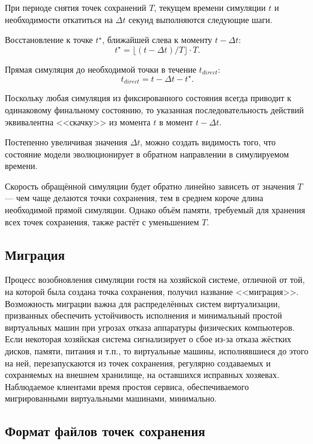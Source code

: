 При периоде снятия точек сохранений $T$, текущем времени симуляции $t$  и необходимости откатиться на $\Delta t$ секунд выполняются следующие шаги.

\begin{enumerate*}
    \item Восстановление к точке $t^\star$, ближайшей слева к моменту $t-\Delta t$:
    $$ t^\star = \lfloor (t - \Delta t) / T \rfloor \cdot T. $$
    \item Прямая симуляция до необходимой точки в течение $t_{direct}$:
    $$t_{direct} = t - \Delta t - t^\star .$$
\end{enumerate*}

Поскольку любая симуляция из фиксированного состояния всегда приводит к одинаковому финальному состоянию, то указанная последовательность действий эквивалентна <<скачку>> из момента $t$ в момент $t - \Delta t$.

Постепенно увеличивая значения $\Delta t$, можно создать видимость того, что состояние модели эволюционирует в обратном направлении в симулируемом времени. 

Скорость обращённой симуляции будет обратно линейно зависеть от значения $T$ --- чем чаще делаются точки сохранения, тем в среднем короче длина необходимой прямой симуляции. Однако объём памяти, требуемый для хранения всех точек сохранения, также растёт с уменьшением $T$.

\subsection{Миграция}

Процесс возобновления симуляции гостя на хозяйской системе, отличной от той, на которой была создана точка сохранения, получил название <<миграция>>. Возможность миграции важна для распределённых систем виртуализации, призванных обеспечить устойчивость исполнения и минимальный простой виртуальных машин при угрозах отказа аппаратуры физических компьютеров. Если некоторая хозяйская система сигнализирует о сбое из-за отказа жёстких дисков, памяти, питания и т.п., то виртуальные машины, исполнявшиеся до этого на ней, перезапускаются из точек сохранения, регулярно создаваемых и сохраняемых на внешнем хранилище, на оставшихся исправных хозяевах. Наблюдаемое клиентами время простоя сервиса, обеспечиваемого мигрированными виртуальными машинами, минимально.

\subsection[Формат точек сохранения]{Формат файлов точек сохранения}


